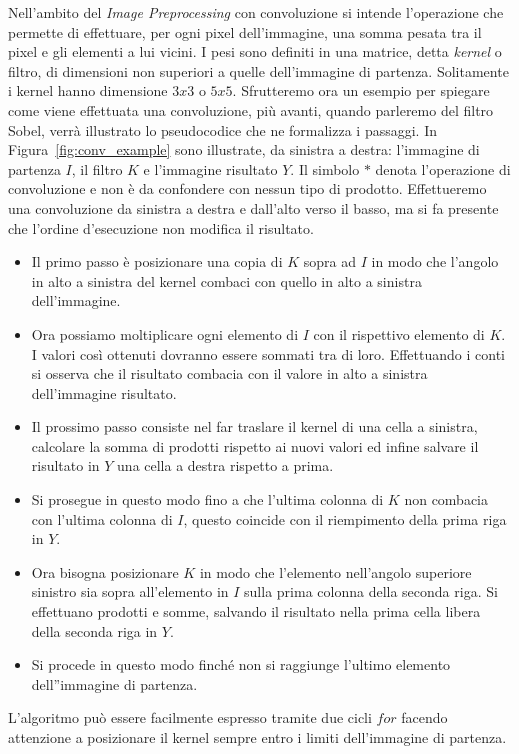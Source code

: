 Nell'ambito del \textit{Image Preprocessing} con convoluzione si intende l'operazione che permette di effettuare, per ogni pixel dell'immagine, una somma pesata tra il pixel e gli elementi a lui vicini.
I pesi sono definiti in una matrice, detta \textit{kernel} o filtro, di dimensioni non superiori a quelle dell'immagine di partenza.
Solitamente i kernel hanno dimensione $3x3$ o $5x5$.
Sfrutteremo ora un esempio per spiegare come viene effettuata una convoluzione, più avanti, quando parleremo del filtro Sobel, verrà illustrato lo pseudocodice che ne formalizza i passaggi.
In Figura~\ref{fig:conv_example} sono illustrate, da sinistra a destra: l'immagine di partenza $I$, il filtro $K$ e l'immagine risultato $Y$.
Il simbolo $*$ denota l'operazione di convoluzione e non è da confondere con nessun tipo di prodotto.
Effettueremo una convoluzione da sinistra a destra e dall'alto verso il basso, ma si fa presente che l'ordine d'esecuzione non modifica il risultato.
\begin{itemize}
  \item Il primo passo è posizionare una copia di $K$ sopra ad $I$ in modo che l'angolo in alto a sinistra del kernel combaci con quello in alto a sinistra dell'immagine.
  \item Ora possiamo moltiplicare ogni elemento di $I$ con il rispettivo elemento di $K$.
    I valori così ottenuti dovranno essere sommati tra di loro.
    Effettuando i conti si osserva che il risultato combacia con il valore in alto a sinistra dell'immagine risultato.
  \item Il prossimo passo consiste nel far traslare il kernel di una cella a sinistra, calcolare la somma di prodotti rispetto ai nuovi valori ed infine salvare il risultato in $Y$ una cella a destra rispetto a prima.
  \item Si prosegue in questo modo fino a che l'ultima colonna di $K$ non combacia con l'ultima colonna di $I$, questo coincide con il riempimento della prima riga in $Y$.
  \item Ora bisogna posizionare $K$ in modo che l'elemento nell'angolo superiore sinistro sia sopra all'elemento in $I$ sulla prima colonna della seconda riga.
    Si effettuano prodotti e somme, salvando il risultato nella prima cella libera della seconda riga in $Y$.
  \item Si procede in questo modo finché non si raggiunge l'ultimo elemento dell''immagine di partenza.
\end{itemize}

L'algoritmo può essere facilmente espresso tramite due cicli $for$ facendo attenzione a posizionare il kernel sempre entro i limiti dell'immagine di partenza.

